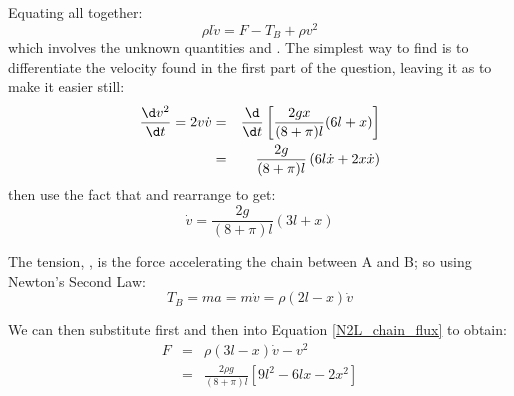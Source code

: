 \begin{problem}
{\begin{enumerate}
Equating all together:
\begin{equation} 
\rho l \dot{v} = F - T_{B} + \rho v^{2} \label{N2L_chain_flux}
\end{equation}
which involves the unknown quantities  and . The simplest way to find  is to differentiate the velocity found in the first part of the question, leaving it as  to make it easier still:
\begin{eqnarray*} 
\frac{\d v^{2}}{\d t} = 2v\dot{v} &=& \frac{\d}{\d t} \left[\frac{2gx}{(8 + \pi)l}(6l + x)\right] \\ 
&=& \frac{2g}{(8 + \pi)l}\left(6l\dot{x} + 2x\dot{x}\right) 
\end{eqnarray*}
then use the fact that  and rearrange to get:
\begin{equation*} 
\dot{v} = \frac{2g}{(8 + \pi)l}\left(3l + x\right) 
\end{equation*}

The tension, , is the force accelerating the chain between A and B; so using Newton's Second Law:
\begin{equation*} 
T_{B} = ma = m\dot{v} = \rho(2l - x)\dot{v} 
\end{equation*}

We can then substitute first  and then  into Equation \eqref{N2L_chain_flux} to obtain:
\begin{eqnarray*} 
F &=& \rho(3l - x)\dot{v} - v^{2} \\ 
&=& \frac{2\rho g}{(8 + \pi)l}\left[9l^{2} - 6lx - 2x^{2}\right] 
\end{eqnarray*}
\end{enumerate}
}
\end{problem}